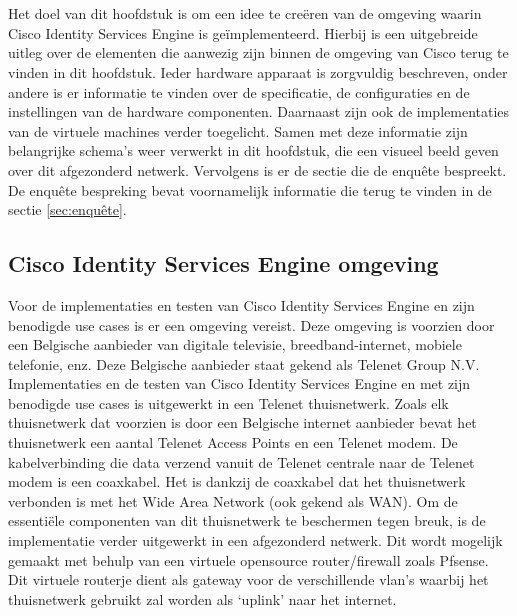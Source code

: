 
\chapter*{}
\label{ch:Proof of concept}

Het doel van dit hoofdstuk is om een idee te creëren van de omgeving waarin Cisco Identity Services Engine is geïmplementeerd. Hierbij is een uitgebreide uitleg over de elementen die aanwezig zijn binnen de omgeving van Cisco terug te vinden in dit hoofdstuk. Ieder hardware apparaat is zorgvuldig beschreven, onder andere is er informatie te vinden over de specificatie, de configuraties en de instellingen van de hardware componenten. Daarnaast zijn ook de implementaties van de virtuele machines verder toegelicht.
\newline
\newline
Samen met deze informatie zijn belangrijke schema’s weer verwerkt in dit hoofdstuk, die een visueel beeld geven over dit afgezonderd netwerk. 
Vervolgens is er de sectie die de enquête bespreekt. De enquête bespreking bevat voornamelijk informatie die terug te vinden in de sectie \ref{sec:enquête}. 

\section{Cisco Identity Services Engine omgeving}

Voor de implementaties en testen van Cisco Identity Services Engine en zijn benodigde use cases is er een omgeving vereist. Deze omgeving is voorzien door een Belgische aanbieder van digitale televisie, breedband-internet, mobiele telefonie, enz. Deze Belgische aanbieder staat gekend als Telenet Group N.V. Implementaties en de testen van Cisco Identity Services Engine en met zijn benodigde use cases is uitgewerkt in een Telenet thuisnetwerk.
\newline
Zoals elk thuisnetwerk dat voorzien is door een Belgische internet aanbieder bevat het thuisnetwerk een aantal Telenet Access Points en een Telenet modem. De kabelverbinding die data verzend vanuit de Telenet centrale naar de Telenet modem is een coaxkabel. Het is dankzij de coaxkabel dat het thuisnetwerk verbonden is met het Wide Area Network (ook gekend als WAN).
\newline
\newline
Om de essentiële componenten van dit thuisnetwerk te beschermen tegen breuk, is de implementatie verder uitgewerkt in een afgezonderd netwerk. Dit wordt mogelijk gemaakt met behulp van een virtuele opensource router/firewall zoals Pfsense. Dit virtuele routerje dient als gateway voor de verschillende vlan’s waarbij het thuisnetwerk gebruikt zal worden als ‘uplink’ naar het internet. 

